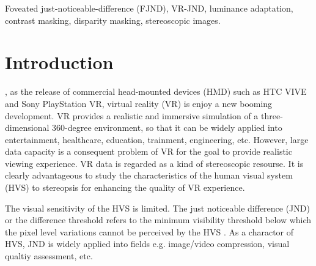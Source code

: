 \documentclass[journal]{IEEEtran}
\begin{document}



\maketitle

\begin{abstract}

\end{abstract}

\begin{IEEEkeywords}
Foveated just-noticeable-difference (FJND), VR-JND, luminance adaptation, contrast masking, disparity masking, stereoscopic images.
\end{IEEEkeywords}


\IEEEpeerreviewmaketitle

\section{Introduction}
, as the release of commercial head-mounted devices (HMD) such as HTC VIVE and Sony PlayStation VR, virtual reality (VR) is enjoy a new booming development. VR provides a realistic and immersive simulation of a three-dimensional 360-degree environment, so that it can be widely applied into entertainment, healthcare, education, trainment, engineering, etc. However, large data capacity is a consequent problem of VR for the goal to provide realistic viewing experience. VR data is regarded as a kind of stereoscopic resourse. It is clearly advantageous to study the characteristics of the human visual system (HVS) to stereopsis for enhancing the quality of VR experience.

The visual sensitivity of the HVS is limited. The just noticeable difference (JND) or the difference threshold refers to the minimum visibility threshold below which the pixel level variations cannot be perceived by the HVS \cite{RN634}. As a charactor of HVS, JND is widely applied into fields e.g. image/video compression, visual qualtiy assessment, etc. 
\end{document}
